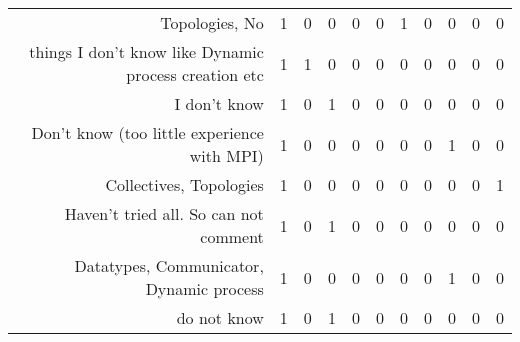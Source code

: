 {\begin{landscape}
\begin{longtable}[htb]{r|c|c|c|c|c|c|c|c|c|c}
{Topologies, No} & 1 & 0 & 0 & 0 & 0 & 1 & 0 & 0 & 0 & 0 \\%
{things I don't know like Dynamic process creation etc} & 1 & 1 & 0 & 0 & 0 & 0 & 0 & 0 & 0 & 0 \\%
{I don't know} & 1 & 0 & 1 & 0 & 0 & 0 & 0 & 0 & 0 & 0 \\%
{Don't know (too little experience with MPI)} & 1 & 0 & 0 & 0 & 0 & 0 & 0 & 1 & 0 & 0 \\%
{Collectives, Topologies} & 1 & 0 & 0 & 0 & 0 & 0 & 0 & 0 & 0 & 1 \\%
{Haven't tried all. So can not comment} & 1 & 0 & 1 & 0 & 0 & 0 & 0 & 0 & 0 & 0 \\%
{Datatypes, Communicator, Dynamic process} & 1 & 0 & 0 & 0 & 0 & 0 & 0 & 1 & 0 & 0 \\%
{do not know} & 1 & 0 & 1 & 0 & 0 & 0 & 0 & 0 & 0 & 0 \\%
\hline%
\end{longtable}%
\end{landscape}}%
\clearpage%
